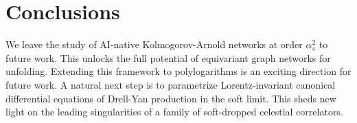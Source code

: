 \section{Conclusions}\label{sec:conclusions}

We leave the study of AI-native Kolmogorov-Arnold networks at order
$\alpha_s^2$ to future work. This unlocks the full potential of
equivariant graph networks for unfolding. Extending this framework to
polylogarithms is an exciting direction for future work. A natural next
step is to parametrize Lorentz-invariant canonical differential
equations of Drell-Yan production in the soft limit. This sheds new
light on the leading singularities of a family of soft-dropped celestial
correlators.

